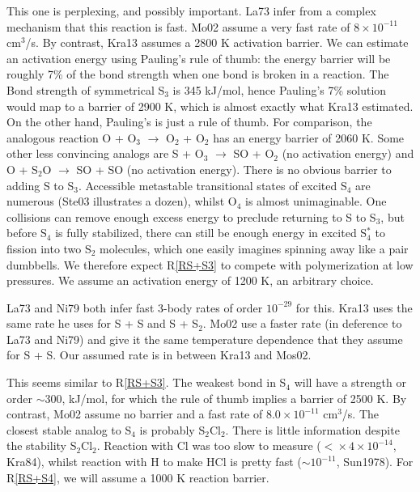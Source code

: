 \documentclass[12pt,landscape]{article}
\newcounter{reaction}
\begin{document}
 This one is perplexing, and possibly important. 
La73 infer from a complex mechanism that this reaction is fast.  
Mo02 assume a very fast rate of $8\times 10^{-11}$ cm$^3$/s.
By contrast, Kra13 assumes a 2800 K activation barrier. 
We can estimate an activation energy using Pauling's rule of thumb: the energy barrier will be roughly 7\% of the bond strength when one bond is broken in a reaction.
The Bond strength of symmetrical S$_3$ is 345 kJ/mol, hence Pauling's 7\% solution would map to a barrier of 2900 K,  
which is almost exactly what Kra13 estimated.
On the other hand, Pauling's is just a rule of thumb. 
 For comparison, the analogous reaction O + O$_3$ $\rightarrow$ O$_2$ + O$_2$ has an energy barrier of 2060 K.
Some other less convincing analogs are S + O$_3$ $\rightarrow$ SO + O$_2$ (no activation energy) and O + S$_2$O $\rightarrow$ SO + SO (no activation energy).
There is no obvious barrier to adding S to S$_3$.  
Accessible metastable transitional states of excited S$_4$ are numerous (Ste03 illustrates a dozen), whilst O$_4$ is almost unimaginable.
One collisions can remove enough excess energy to preclude returning to S to S$_3$, but before S$_4$ is fully stabilized,
 there can still be enough energy in excited S$_4^{\ast}$ to fission into two S$_2$ molecules, which one easily imagines spinning away like a pair dumbbells.
We therefore expect R\ref{RS+S3} to compete with polymerization at low pressures.
We assume an activation energy of 1200 K, an arbitrary choice. 

 La73 and Ni79 both infer fast 3-body rates of order $10^{-29}$ for this.
 Kra13 uses the same rate he uses for S + S and S + S$_2$.
 Mo02 use a faster rate (in deference to La73 and Ni79) and give it the same temperature dependence that they assume for S + S.
 Our assumed rate is in between Kra13 and Mos02.

 This seems similar to R\ref{RS+S3}.  
The weakest bond in S$_4$ will have a strength or order $\sim 300$, kJ/mol, for which the rule of thumb implies a barrier of 2500 K.
 By contrast, Mo02 assume no barrier and a fast rate of $8.0\!\times\! 10^{-11}$ cm$^3$/s.
The closest stable analog to S$_4$ is probably S$_2$Cl$_2$. 
There is little information despite the stability S$_2$Cl$_2$.
Reaction with Cl was too slow to measure ($<\!\times 4\times 10^{-14}$, Kra84), whilst reaction with H to make HCl is pretty fast ($\sim\! 10^{-11}$, Sun1978).
For R\ref{RS+S4}, we will assume a 1000 K reaction barrier.   
\end{document}
